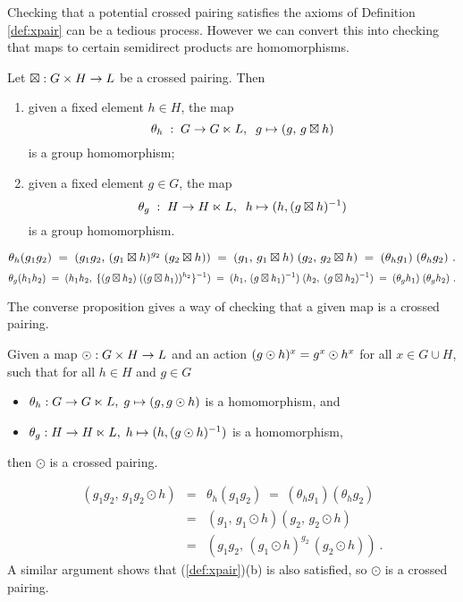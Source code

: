 Checking that a potential crossed pairing satisfies the axioms
of Definition \ref{def:xpair}  can be a tedious process.  
However we can convert this into checking that
maps to certain semidirect products are homomorphisms.

\begin{lem} \label{lem:xpair-to-homs}
Let  $\boxtimes : G \times H \to L$  be a crossed pairing.  Then
\begin{enumerate}[{\rm (a)}]
\item
given a fixed element   $h \in H$,  the map
$$
\theta_h \;:\; G \to G \ltimes L, \;\; g \mapsto (g,\,g \boxtimes h)
$$
is a group homomorphism;
\item
given a fixed element   $g \in G$,  the map
$$
\theta_g \;:\; H \to H \ltimes L, \;\; h \mapsto (h,(g \boxtimes h)^{-1})
$$
is a group homomorphism.
\end{enumerate}
\end{lem}
\begin{pf}
$$
\theta_h(g_1g_2)
  \;=\;  (g_1g_2,\,(g_1 \boxtimes h)^{g_2}\;(g_2 \boxtimes h)) 
  \;=\;  (g_1,\,g_1 \boxtimes h)\;(g_2,\,g_2 \boxtimes h)    
  \;=\;  (\theta_h g_1)\;(\theta_h g_2)~.
$$
$$
\theta_g(h_1h_2)
  \;=\;  (h_1h_2,\;\{(g \boxtimes h_2)\;((g \boxtimes h_1))^{h_2}\}^{-1}) 
  \;=\;  (h_1,\,(g \boxtimes h_1)^{-1})\;(h_2,\;(g \boxtimes h_2)^{-1})    
  \;=\;  (\theta_g h_1)\;(\theta_g h_2)~.
$$
\end{pf}

The converse proposition gives a way of checking
that a given map is a crossed pairing.

\begin{prop} \label{prop:homs-to-xpair}
Given a map  $\odot : G \times H \to L$
and an action  $(g \odot h)^x = g^x \odot h^x$  for all  $x \in G \cup H$,
such that for all  $h \in H$ and $g \in G$
\begin{itemize}
\item
$\theta_h : G \to G \ltimes L,\; g \mapsto (g,g \odot h)$
is a homomorphism, and
\item
$\theta_g : H \to H \ltimes L,\; h \mapsto (h, (g \odot h)^{-1})$
is a homomorphism,
\end{itemize}
then  $\odot$  is a crossed pairing.
\end{prop}
\begin{pf}
\begin{eqnarray*}
(g_1g_2,\, g_1g_2 \odot h)
  & = &  \theta_h(g_1g_2)
  \;=\;  (\theta_h g_1)(\theta_h g_2)  \\
  & = &  (g_1,\, g_1 \odot h)(g_2,\, g_2 \odot h) \\
  & = &  (g_1g_2,\, (g_1 \odot h)^{g_2}\,(g_2 \odot h)) ~.
\end{eqnarray*}
A similar argument shows that (\ref{def:xpair})(b)  is also satisfied,
so  $\odot$  is a crossed pairing.
\end{pf}

